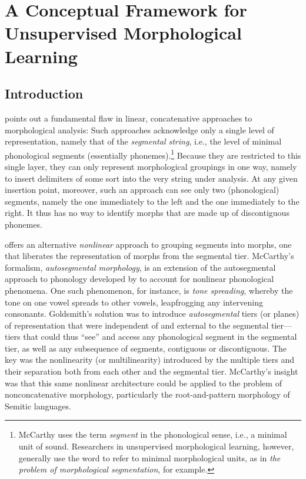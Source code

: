 \chapter{A Conceptual Framework for Unsupervised Morphological Learning}
\label{ch:lit-review}

\section{Introduction}
\label{sec:framework-intro}
\cite{mccarthy:1981} points out a fundamental flaw in linear, 
concatenative approaches to morphological analysis: 
Such approaches acknowledge only a single level of representation, 
namely that of the \emph{segmental string}, i.e., the level of minimal 
phonological segments (essentially phonemes).\footnote{McCarthy uses
 the term \emph{segment} in the phonological sense, i.e., a minimal unit of sound. Researchers in unsupervised morphological learning, however, generally use the word to 
refer to minimal morphological units, 
as in \textit{the problem of morphological segmentation}, for example.}
Because they are restricted to this single layer, they can only represent 
morphological groupings in one way, namely to insert delimiters of 
some sort 
into the very string under analysis. At any given
insertion point, moreover, such an approach can see only two (phonological) segments, namely the one immediately to the left and the one immediately to the right.
It thus
has no way to identify morphs that are made up of discontiguous phonemes.

\cite{mccarthy:1981} offers an alternative \emph{nonlinear} 
approach to grouping segments into morphs, one that liberates the 
representation of morphs from the segmental tier. McCarthy's formalism, 
\emph{autosegmental morphology}, is an extension of the autosegmental 
approach to phonology developed by \citet{goldsmith:1976} to account 
for nonlinear phonological phenomena. One such phenomenon, for instance, 
is \emph{tone spreading}, whereby the tone on one vowel spreads to other 
vowels, leapfrogging any intervening consonants. 
Goldsmith's solution was to introduce \emph{autosegmental} tiers 
(or planes) of representation that were independent of and external 
to the segmental tier---tiers that could thus ``see'' and access any 
phonological segment in the segmental tier, as well as any subsequence 
of segments, contiguous or discontiguous. The key was the nonlinearity 
(or multilinearity)
introduced by the multiple tiers and their separation both from each other 
and the segmental tier. 
McCarthy's insight was that this same nonlinear architecture could be 
applied to the problem of nonconcatenative morphology, particularly the 
root-and-pattern morphology of Semitic languages. 

